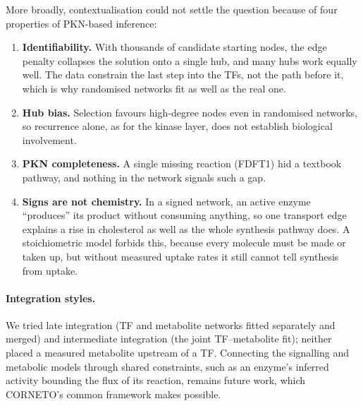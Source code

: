 \documentclass[11pt, a4paper]{article}
\begin{document}
More broadly, contextualisation could not settle the question because of four properties of
PKN-based inference:
\begin{enumerate}[noitemsep, topsep=2pt, leftmargin=*]
  \item \textbf{Identifiability.} With thousands of candidate starting nodes, the edge penalty
        collapses the solution onto a single hub, and many hubs work equally well. The data
        constrain the last step into the TFs, not the path before it, which is why randomised
        networks fit as well as the real one.
  \item \textbf{Hub bias.} Selection favours high-degree nodes even in randomised networks, so
        recurrence alone, as for the kinase layer, does not establish biological involvement.
  \item \textbf{PKN completeness.} A single missing reaction (FDFT1) hid a textbook pathway, and
        nothing in the network signals such a gap.
  \item \textbf{Signs are not chemistry.} In a signed network, an active enzyme ``produces'' its
        product without consuming anything, so one transport edge explains a rise in cholesterol
        as well as the whole synthesis pathway does. A stoichiometric model forbids this, because
        every molecule must be made or taken up, but without measured uptake rates it still cannot
        tell synthesis from uptake.
\end{enumerate}

\paragraph{Integration styles.}
We tried late integration (TF and metabolite networks fitted separately and merged) and
intermediate integration (the joint TF--metabolite fit); neither placed a measured metabolite
upstream of a TF. Connecting the signalling and metabolic models through shared constraints, such
as an enzyme's inferred activity bounding the flux of its reaction, remains future work, which
CORNETO's common framework makes possible.
\end{document}
